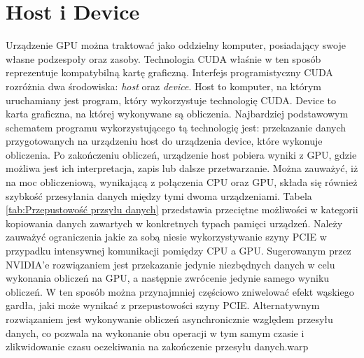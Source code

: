 \section{Host i Device}
Urządzenie GPU można traktować jako oddzielny komputer, posiadający swoje własne podzespoły oraz zasoby. Technologia CUDA właśnie w ten sposób reprezentuje kompatybilną kartę graficzną. Interfejs programistyczny CUDA rozróżnia dwa środowiska: \textit{host} oraz \textit{device}. Host to komputer, na którym uruchamiany jest program, który wykorzystuje technologię CUDA. Device to karta graficzna, na której wykonywane są obliczenia. Najbardziej podstawowym schematem programu wykorzystującego tą technologię jest: przekazanie danych przygotowanych na urządzeniu host do urządzenia device, które wykonuje obliczenia. Po zakończeniu obliczeń, urządzenie host pobiera wyniki z GPU, gdzie możliwa jest ich interpretacja, zapis lub dalsze przetwarzanie. Można zauważyć, iż na moc obliczeniową, wynikającą z połączenia CPU oraz GPU, składa się również szybkość przesyłania danych między tymi dwoma urządzeniami. Tabela \ref{tab:Przepustowość przsyłu danych} przedstawia przeciętne możliwości w kategorii kopiowania danych zawartych w konkretnych typach pamięci urządzeń. Należy zauważyć ograniczenia jakie za sobą niesie wykorzystywanie szyny PCIE w przypadku intensywnej komunikacji pomiędzy CPU a GPU. Sugerowanym przez NVIDIA'e rozwiązaniem jest przekazanie jedynie niezbędnych danych w celu wykonania obliczeń na GPU, a następnie zwrócenie jedynie samego wyniku obliczeń. W ten sposób można przynajmniej częściowo zniwelować efekt wąskiego gardła, jaki może wynikać z przepustowości szyny PCIE. Alternatywnym rozwiązaniem jest wykonywanie obliczeń asynchronicznie względem przesyłu danych, co pozwala na wykonanie obu operacji w tym samym czasie i zlikwidowanie czasu oczekiwania na zakończenie przesyłu danych.warp
